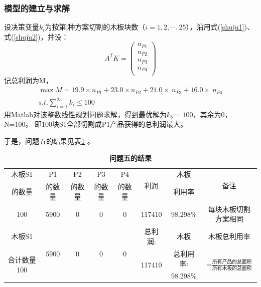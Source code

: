 \documentclass[hyperref,UTF8]{article}
\begin{document}
{\subsubsection{模型的建立与求解}
设决策变量$k_i$为按第i种方案切割的木板块数（$i=1,2,\cdots,25$），沿用式(\ref{shuju1})、式(\ref{shuju2})，并设：
\begin{equation}\label{shuju3}
  A^TK=\left(
         \begin{array}{c}
           n_{P1} \\
           n_{P2} \\
           n_{P3} \\
           n_{P4} \\
         \end{array}
       \right)
\end{equation}
记总利润为M，
\begin{equation}\label{zuixiaozhi3}
\begin{array}{c}
  \max  M=19.9\times n_{P1}+23.0\times n_{P2}+21.0\times\ n_{P3}+16.0\times\ n_{P4} \\
  s.t. \sum_{i=1}^{25}k_i\leq 100
\end{array}
\end{equation}
用Matlab对该整数线性规划问题求解，得到最优解为$k_8=100$，其余为0，N=100。
即100块S1全部切割成P1产品获得的总利润最大。\par
于是，问题五的结果见表\ref{tab:quastion5}
。
\begin{table}[htbp]
  \centering
  \caption{\textbf{问题五的结果}}
    \begin{tabular}{|c|c|c|c|c|c|c|c|}
    \hline
    木板S1 & P1 & P2 & P3 & P4 & \multirow{2}[0]{*}{利润} & 木板 & \multirow{2}[0]{*}{备注} \\
    的数量 & 的数量 & 的数量 & 的数量 & 的数量 &   & 利用率 &  \\\hline
    100 & 5900 & 0 & 0 & 0 & 117410 & 98.298\% & 每块木板切割方案相同 \\\hline
    木板S1 & \multirow{3}[0]{*}{5900} & \multirow{3}[0]{*}{0} & \multirow{3}[0]{*}{0} & \multirow{3}[0]{*}{0} & 总利润: & 木板 & 木板总利用率 \\
    \multirow{2}[0]{*}{合计数量100} &   &   &   &   & \multirow{2}[0]{*}{117410} & 总利用率: & \multirow{2}[0]{*}{=$\frac{\mbox{所有产品的总面积}}{\mbox{所有木板的总面积}}$} \\
      &   &   &   &   &   & 98.298\% &   \\\hline
    \end{tabular}%
  \label{tab:quastion5}%
\end{table}%


}
\end{document}
